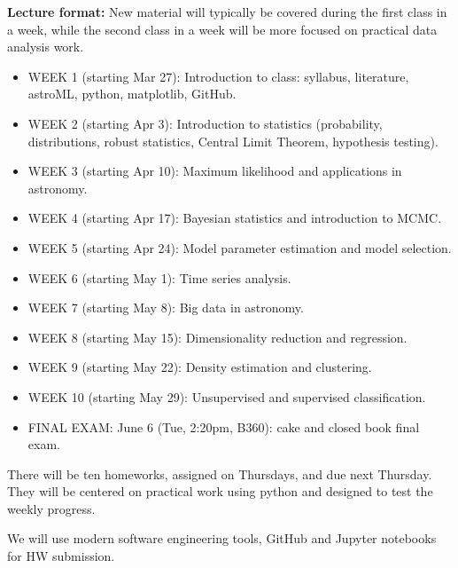 \documentclass[10pt]{article}
\begin{document}
{\bf Lecture format:}
New material will typically be covered during the first class in a week, while
the second class in a week will be more focused on practical data analysis work. 

\newpage 
\begin{itemize}
\item WEEK 1 (starting Mar 27): 
      Introduction to class: syllabus, literature, astroML, python, matplotlib, GitHub. 
      
\item WEEK  2 (starting Apr 3): Introduction to statistics (probability, distributions, 
             robust statistics, Central Limit Theorem,  hypothesis testing).

\item WEEK  3 (starting Apr 10):  Maximum likelihood and applications in astronomy.

\item WEEK  4 (starting Apr 17):  Bayesian statistics and introduction to MCMC.

\item WEEK  5 (starting Apr 24):  Model parameter estimation and model selection.

\item WEEK  6 (starting May 1):   Time series analysis.

\item WEEK  7 (starting May 8):   Big data in astronomy.

\item WEEK  8 (starting May 15): Dimensionality reduction and regression.

\item WEEK  9 (starting May 22):  Density estimation and clustering.

\item WEEK  10 (starting May 29):  Unsupervised and supervised classification.

\item FINAL EXAM: June 6 (Tue, 2:20pm, B360): cake and closed book final exam.

\end{itemize}


\vskip 0.2in


There will be ten homeworks, assigned on Thursdays, and due next Thursday. They will
be centered on practical work using python and designed to test the weekly progress. 

We will use modern software engineering tools, GitHub and Jupyter notebooks for HW submission. 
\end{document}
